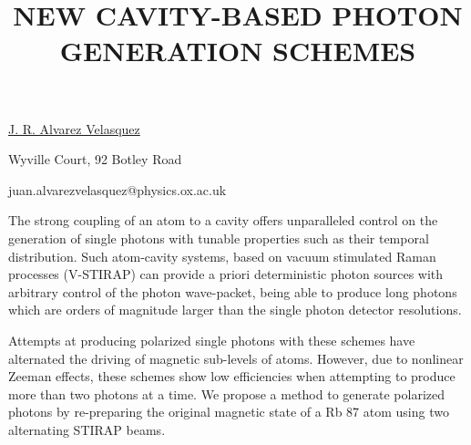 \title{NEW CAVITY-BASED PHOTON GENERATION SCHEMES}

\underline{J. R. Alvarez Velasquez}  

{\normalsize{\vspace{-4mm}
Wyville Court, 92 Botley Road



\email juan.alvarezvelasquez@physics.ox.ac.uk}}

The strong coupling of an atom to a cavity offers unparalleled control on the generation of single photons with tunable properties such as their temporal distribution. Such atom-cavity systems, based on vacuum stimulated Raman processes (V-STIRAP) can provide a priori deterministic photon sources with arbitrary control of the photon wave-packet, being able to produce long photons which are orders of magnitude larger than the single photon detector resolutions.

Attempts at producing polarized single photons with these schemes have alternated the driving of magnetic sub-levels of atoms. However, due to nonlinear Zeeman effects, these schemes show low efficiencies when attempting to produce more than two photons at a time. We propose a method to generate polarized photons by re-preparing the original magnetic state of a Rb 87 atom using two alternating STIRAP beams.

\vspace{\baselineskip}
